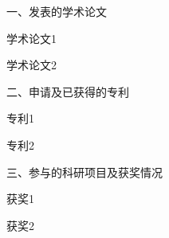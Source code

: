 \begin{achievement}

\par \vskip10pt
{\fontsize{14pt}{21pt}\selectfont\heiti 一、发表的学术论文}
\par \vskip10pt

学术论文1

学术论文2

\par \vskip10pt
{\fontsize{14pt}{21pt}\selectfont\heiti 二、申请及已获得的专利}
\par \vskip10pt

专利1

专利2


\par \vskip10pt
{\fontsize{14pt}{21pt}\selectfont\heiti 三、参与的科研项目及获奖情况}
\par \vskip10pt

获奖1

获奖2


\end{achievement}